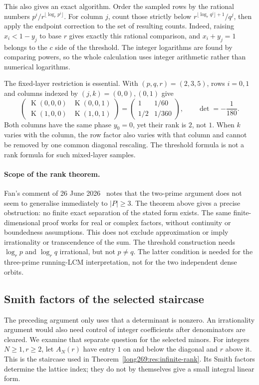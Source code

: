 \documentclass[11pt]{article}
\theoremstyle{remark}
\theoremstyle{plain}
\newcommand{\Kernel}{\operatorname{K}}
\begin{document}
This also gives an exact algorithm.  Order the sampled rows by the
rational numbers $p^i/r^{\lfloor\log_r p^i\rfloor}$.  For column $j$, count
those strictly below $r^{\lfloor\log_r q^j\rfloor+1}/q^j$, then apply the
endpoint correction to the set of resulting counts.  Indeed, raising
$x_i<1-y_j$ to base $r$ gives exactly this rational comparison, and
$x_i+y_j=1$ belongs to the $c$ side of the threshold.  The integer
logarithms are found by comparing powers, so the whole calculation uses
integer arithmetic rather than numerical logarithms.

The fixed-layer restriction is essential.  With $(p,q,r)=(2,3,5)$, rows
$i=0,1$ and columns indexed by $(j,k)=(0,0),(0,1)$ give
\[
 \begin{pmatrix}
  \Kernel(0,0,0)&\Kernel(0,0,1)\\
  \Kernel(1,0,0)&\Kernel(1,0,1)
 \end{pmatrix}
 =\begin{pmatrix}1&1/60\\1/2&1/360\end{pmatrix},
 \qquad \det=-\frac1{180}.
\]
Both columns have the same phase $y_0=0$, yet their rank is $2$, not $1$.
When $k$ varies with the column, the row factor also varies with that
column and cannot be removed by one common diagonal rescaling.  The
threshold formula is not a rank formula for such mixed-layer samples.

\paragraph{Scope of the rank theorem.}
Fan's comment of 26 June 2026~\cite{fan2026comment} notes that the
two-prime argument does not seem to generalise immediately to $|P|\ge3$.
The theorem above gives a precise obstruction: no finite exact separation
of the stated form exists.  The same finite-dimensional proof works for
real or complex factors, without continuity or boundedness assumptions.
This does not exclude approximation or imply irrationality or
transcendence of the sum.
The threshold construction needs $\log_r p$ and $\log_r q$ irrational,
but not $p\ne q$.  The latter condition is needed for the three-prime
running-LCM interpretation, not for the two independent dense orbits.

\subsection{Smith factors of the selected staircase}
\label{long269:sec:selected-kernel-height}
The preceding argument only uses that a determinant is nonzero. An
irrationality argument would also need control of integer coefficients
after denominators are cleared. We examine that separate question for the
selected minors. For integers $N\ge1,r\ge2$, let $A_N(r)$ have entry $1$
on and below the diagonal and $r$ above it. This is the staircase used in
Theorem~\ref{long269:res:infinite-rank}. Its Smith factors determine the
lattice index; they do not by themselves give a small integral linear form.
\end{document}
